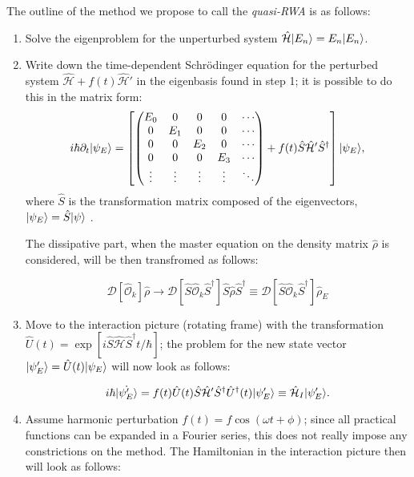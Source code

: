 The outline of the method we propose to call the \textit{quasi-RWA} is as follows:
\begin{enumerate}
\item Solve the eigenproblem for the unperturbed system $\hat{\mathcal{H}} \lvert E_n\rangle = E_n \lvert E_n\rangle$.
\item Write down the time-dependent Schrödinger equation for the perturbed system $\hat{\mathcal{H}} + f(t)\hat{\mathcal{H}}'$ in the eigenbasis found in step 1; it is possible to do this in the matrix form:
\begin{equation*}
i\hbar \partial_t \lvert\psi_E\rangle = 
\left[\left(
\begin{matrix}
E_0 & 0 & 0 & 0 & \cdots\\
0 &E_1 & 0 & 0 & \cdots\\
0 & 0 & E_2 & 0 & \cdots\\
0 & 0 & 0 & E_3 & \cdots\\
\vdots&\vdots&\vdots&\vdots& \ddots
\end{matrix}
\right)
+
f(t)\hat{S} \hat{\mathcal{H}}' \hat{S}^\dag\right]
\lvert\psi_E\rangle,
\end{equation*}
where $\hat S$ is the transformation matrix composed of the eigenvectors, $\lvert\psi_E\rangle = \hat S\lvert\psi\rangle$ .

The dissipative part, when the master equation on the density matrix $\hat \rho$ is considered, will be then transfromed as follows:

\[
\mathcal{D}[\hat{\mathcal{O}}_k]\hat \rho \rightarrow \mathcal{D}[\hat S\hat{\mathcal{O}}_k\hat{S}^\dag]\hat S \hat \rho\hat{S}^\dag \equiv  \mathcal{D}[\hat S\hat{\mathcal{O}}_k\hat{S}^\dag]\hat{\rho}_E
\]

\item Move to the interaction picture (rotating frame) with the transformation $\hat{U}(t) = \exp[i \hat{S} \hat{\mathcal{H}} \hat{S}^\dag t/\hbar]$; the problem for the new state vector $\lvert\psi_E'\rangle = \hat{U}(t) \lvert\psi_E\rangle$ will now look as follows:

\begin{equation*}
i\hbar \dot{\lvert\psi_E'\rangle} = f(t)\hat{U}(t) \hat{S} \hat{\mathcal{H}}' \hat{S}^\dag \hat{U}^\dag(t) \lvert\psi_E'\rangle \equiv \hat{\mathcal{H}}_I \lvert\psi_E'\rangle .
\end{equation*}
\item Assume harmonic perturbation $f(t) = f \cos(\omega t+\phi)$; since all practical functions can be expanded in a Fourier series, this does not really impose any constrictions on the method. The Hamiltonian in the interaction picture then will look as follows:


\end{enumerate}
